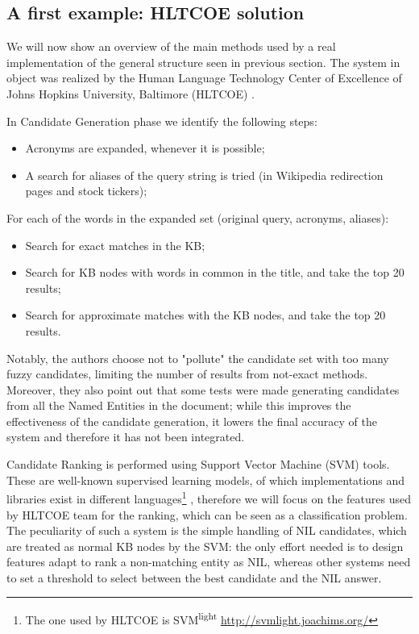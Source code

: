 \documentclass[a4paper,11pt]{report}
\begin{document}
\subsection{A first example: HLTCOE solution}
We will now show an overview of the main methods used by a real implementation of the general structure seen in previous section. The system in object was realized by the Human Language Technology Center of Excellence of Johns Hopkins University, Baltimore (HLTCOE) \cite{2010hltcoe}.

In Candidate Generation phase we identify the following steps:
\begin{itemize}
\item Acronyms are expanded, whenever it is possible;
\item A search for aliases of the query string is tried (in Wikipedia redirection pages and stock tickers);
\end{itemize}

For each of the words in the expanded set (original query, acronyms, aliases):
\begin{itemize}

\item Search for exact matches in the KB;
\item Search for KB nodes with words in common in the title, and take the top 20 results;
\item Search for approximate matches with the KB nodes, and take the top 20 results.
\end{itemize}

Notably, the authors choose not to "pollute" the candidate set with too many fuzzy candidates, limiting the number of results from not-exact methods. Moreover, they also point out that some tests were made generating candidates from all the Named Entities in the document; while this improves the effectiveness of the candidate generation, it lowers the final accuracy of the system and therefore it has not been integrated.

Candidate Ranking is performed using Support Vector Machine (SVM) tools. These are well-known supervised learning models, of which implementations and libraries exist in different languages\footnote{The one used by HLTCOE is SVM\textsuperscript{light} \url{http://svmlight.joachims.org/}}
, therefore we will focus on the features used by HLTCOE team for the ranking, which can be seen as a classification problem. The peculiarity of such a system is the simple handling of NIL candidates, which are treated as normal KB nodes by the SVM: the only effort needed is to design features adapt to rank a non-matching entity as NIL, whereas other systems need to set a threshold to select between the best candidate and the NIL answer.
\end{document}

